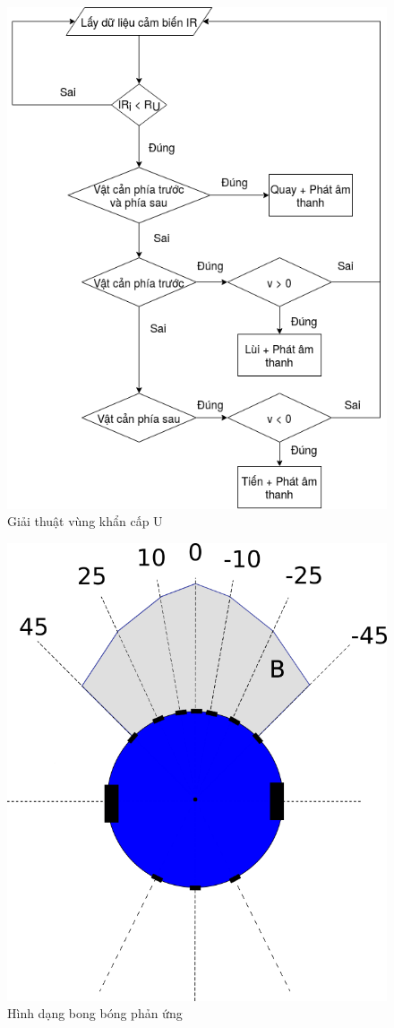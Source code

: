 \begin{figure}[htbp]
    \centering
    \includegraphics[width = 0.65\linewidth]{figures/Urgent_Alg.png}
    \caption{Giải thuật vùng khẩn cấp U}
    \label{fig:urgent_alg}
\end{figure}

\begin{figure}[htbp]
    \centering
    \includegraphics[width=0.4\linewidth]{figures/BB-argorithm.png}
    \caption{Hình dạng bong bóng phản ứng}
    \label{fig:BB-argorithm}
\end{figure}


